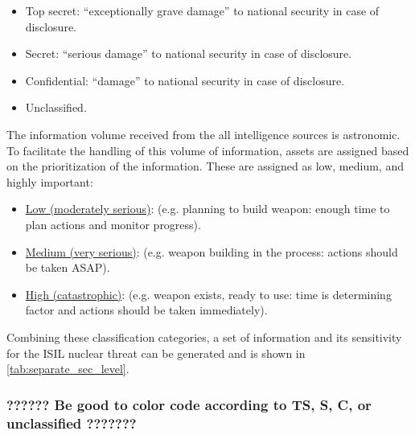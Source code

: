 \documentclass{report}
\begin{document}
\begin{itemize}
  \item Top secret: \enquote{exceptionally grave damage} to national security in case of disclosure.
  \item Secret: \enquote{serious damage} to national security in case of disclosure.
  \item Confidential: \enquote{damage} to national security in case of disclosure.
  \item Unclassified.
\end{itemize}

The information volume received from the all intelligence sources is astronomic. To facilitate the handling of this volume of information, assets are assigned based on the prioritization of the information. These are assigned as low, medium, and highly important:

\begin{itemize}
  \item \underline{Low (moderately serious)}: (e.g. planning to build weapon: enough time to plan actions and monitor progress).
  \item \underline{Medium (very serious)}: (e.g. weapon building in the process: actions should be taken ASAP).
  \item \underline{High (catastrophic)}: (e.g. weapon exists, ready to use: time is determining factor and actions should be taken immediately).
\end{itemize}

Combining these classification categories, a set of information and its sensitivity for the ISIL nuclear threat can be generated and is shown in \autoref{tab:separate_sec_level}.  

\subsubsection{?????? Be good to color code according to TS, S, C, or unclassified ???????}
\end{document}
